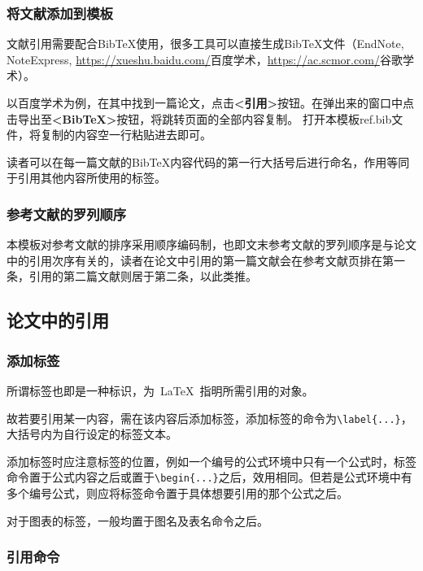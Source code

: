 \subsubsection{将文献添加到模板}

文献引用需要配合BibTeX使用，很多工具可以直接生成BibTeX文件（EndNote, NoteExpress, \href{https://xueshu.baidu.com/}{https://xueshu.baidu.com/}{百度学术}，\href{https://ac.scmor.com/}{https://ac.scmor.com/}{谷歌学术}）。\par 以百度学术为例，在其中找到一篇论文，点击\textbf{<引用>}按钮。在弹出来的窗口中点击导出至\textbf{<BibTeX>}按钮，将跳转页面的全部内容复制。 打开本模板ref.bib文件，将复制的内容空一行粘贴进去即可。

读者可以在每一篇文献的BibTeX内容代码的第一行大括号后进行命名，作用等同于引用其他内容所使用的标签。

\subsubsection{参考文献的罗列顺序}

本模板对参考文献的排序采用顺序编码制，也即文末参考文献的罗列顺序是与论文中的引用次序有关的，读者在论文中引用的第一篇文献会在参考文献页排在第一条，引用的第二篇文献则居于第二条，以此类推。

\subsection{论文中的引用}

\subsubsection{添加标签}

所谓标签也即是一种标识，为~\LaTeX~指明所需引用的对象。

故若要引用某一内容，需在该内容后添加标签，添加标签的命令为\verb|\label{...}|，大括号内为自行设定的标签文本。

添加标签时应注意标签的位置，例如一个编号的公式环境中只有一个公式时，标签命令置于公式内容之后或置于\verb|\begin{...}|之后，效用相同。但若是公式环境中有多个编号公式，则应将标签命令置于具体想要引用的那个公式之后。

对于图表的标签，一般均置于图名及表名命令之后。

\subsubsection{引用命令}

